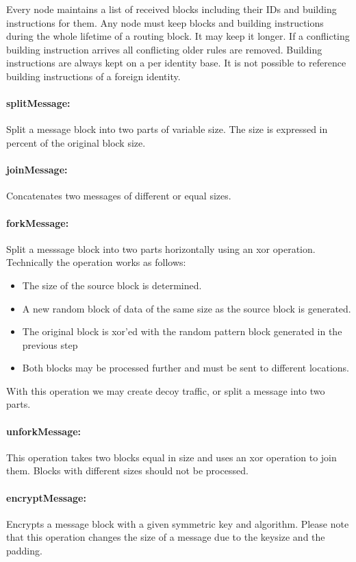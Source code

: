 Every node maintains a list of received blocks including their IDs and building instructions for them. Any node must keep blocks and building instructions during the whole lifetime of a routing block. It may keep it longer. If a conflicting building instruction arrives all conflicting older rules are removed. Building instructions are always kept on a per identity base. It is not possible to reference building instructions of a foreign identity.

\paragraph{splitMessage:} Split a message block into two parts of variable size. The size is expressed in percent of the original block size.

\paragraph{joinMessage:} Concatenates two messages of different or equal sizes.

\paragraph{forkMessage:} Split a messsage block into two parts horizontally using an xor operation. Technically the operation works as follows:
\begin{itemize}
	\item The size of the source block is determined.
	\item A new random block of data of the same size as the source block is generated.
	\item The original block is xor'ed with the random pattern block generated in the previous step
	\item Both blocks may be processed further and must be sent to different locations.
\end{itemize}
With this operation we may create decoy traffic, or split a message into two parts.

\paragraph{unforkMessage:} This operation takes two blocks equal in size and uses an xor operation to join them. Blocks with different sizes should not be processed.

\paragraph{encryptMessage:} Encrypts a message block with a given symmetric key and algorithm. Please note that this operation changes the size of a message due to the keysize and the padding.

